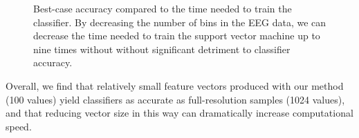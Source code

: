 \begin{figure}[!h]
  \vspace{-0.2cm}
  \centering
   {}
  \caption{ Best-case accuracy compared to the time needed to train the classifier. By decreasing the number of bins in the EEG data, we can decrease the time needed to train the support vector machine up to nine times without without significant detriment to classifier accuracy. }
  \label{fig:accuracy_vs_training}
 \end{figure}

Overall, we find that relatively small feature vectors produced with our method (100 values) yield classifiers as accurate as full-resolution samples (1024 values), and that reducing vector size in this way can dramatically increase computational speed.
